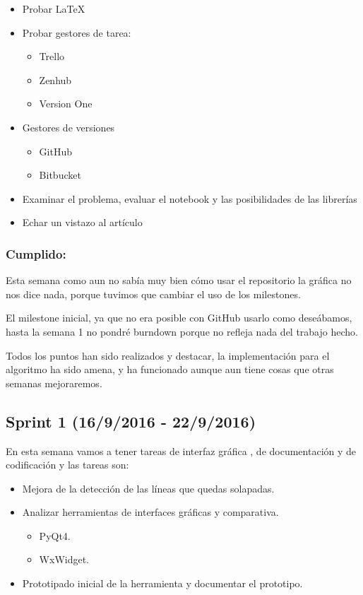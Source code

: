\begin{itemize}
	\item Probar \LaTeX 
	\item Probar gestores de tarea: 
	\begin{itemize}
	\item Trello 
	\item Zenhub 
	\item Version One
	\end{itemize}
	\item Gestores de versiones 
	\begin{itemize}
	\item GitHub 
	\item Bitbucket 
	\end{itemize}
	\item Examinar el problema, evaluar el notebook y las posibilidades de las librerías 
	\item Echar un vistazo al artículo 
\end{itemize}

\subsubsection{Cumplido:}
Esta semana como aun no sabía muy bien cómo usar el repositorio  la gráfica no nos dice nada, porque tuvimos que cambiar el uso de los milestones.

El milestone inicial, ya que no era posible con GitHub usarlo como deseábamos, hasta la semana 1 no pondré burndown porque no refleja nada del trabajo hecho.

Todos los puntos han sido realizados y destacar, la implementación para el algoritmo ha sido amena, y ha funcionado aunque aun tiene cosas que otras semanas mejoraremos.

\subsection{Sprint 1 (16/9/2016 - 22/9/2016)}
 En esta semana vamos a tener tareas de interfaz gráfica , de documentación y de codificación y las tareas son:

\begin{itemize}
\item Mejora de la detección de las líneas que quedas solapadas. 
\item Analizar herramientas de interfaces gráficas y comparativa.
	\begin{itemize}
	\item PyQt4. 
	\item WxWidget.
	\end{itemize}
\item Prototipado inicial de la herramienta y documentar el prototipo.
\end{itemize}




